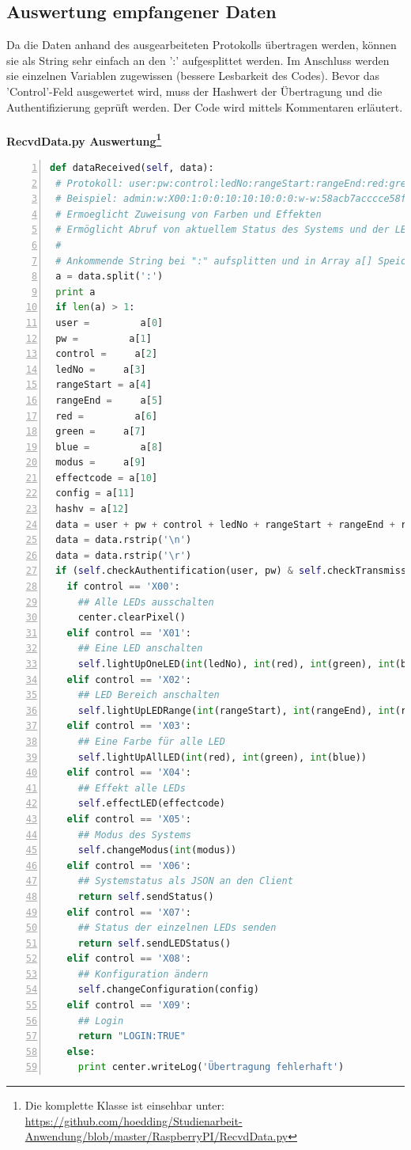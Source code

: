 \subsection{Auswertung empfangener Daten}
Da die Daten anhand des ausgearbeiteten Protokolls übertragen werden, können sie als String sehr einfach an den ':' aufgesplittet werden. Im Anschluss werden sie einzelnen Variablen zugewissen (bessere Lesbarkeit des Codes). Bevor das 'Control'-Feld ausgewertet wird, muss der Hashwert der Übertragung und die Authentifizierung geprüft werden. Der Code wird mittels Kommentaren erläutert. \\\\
\textbf{RecvdData.py Auswertung\footnote{Die komplette Klasse ist einsehbar unter: \url{https://github.com/hoedding/Studienarbeit-Anwendung/blob/master/RaspberryPI/RecvdData.py}}} 
\begin{lstlisting}[caption=Auswertung der empfangenen Daten (RcvdData.py), language=python, frame=single, breaklines=true,columns=fullflexible, commentstyle=\color{gray}\upshape, captionpos=b, numbers = left]
def dataReceived(self, data):
 # Protokoll: user:pw:control:ledNo:rangeStart:rangeEnd:red:green:blue:modus:effectcode:config:hashv
 # Beispiel: admin:w:X00:1:0:0:10:10:10:0:0:w-w:58acb7acccce58ffa8b953b12b5a7702bd42dae441c1ad85057fa70b
 # Ermoeglicht Zuweisung von Farben und Effekten
 # Ermöglicht Abruf von aktuellem Status des Systems und der LEDs
 #
 # Ankommende String bei ":" aufsplitten und in Array a[] Speichern:
 a = data.split(':')
 print a
 if len(a) > 1:
 user =         a[0]
 pw =         a[1]
 control =     a[2]
 ledNo =     a[3]
 rangeStart = a[4]
 rangeEnd =     a[5]
 red =         a[6]
 green =     a[7]
 blue =         a[8]
 modus =     a[9]
 effectcode = a[10]
 config = a[11]
 hashv = a[12]
 data = user + pw + control + ledNo + rangeStart + rangeEnd + red + green + blue + modus + effectcode + config
 data = data.rstrip('\n')
 data = data.rstrip('\r')
 if (self.checkAuthentification(user, pw) & self.checkTransmissionData(data, hashv)):
   if control == 'X00':
     ## Alle LEDs ausschalten
     center.clearPixel()
   elif control == 'X01':
     ## Eine LED anschalten
     self.lightUpOneLED(int(ledNo), int(red), int(green), int(blue))
   elif control == 'X02':
     ## LED Bereich anschalten
     self.lightUpLEDRange(int(rangeStart), int(rangeEnd), int(red), int(green), int(blue))
   elif control == 'X03':
     ## Eine Farbe für alle LED
     self.lightUpAllLED(int(red), int(green), int(blue))
   elif control == 'X04':
     ## Effekt alle LEDs
     self.effectLED(effectcode)
   elif control == 'X05':
     ## Modus des Systems
     self.changeModus(int(modus))
   elif control == 'X06':
     ## Systemstatus als JSON an den Client
     return self.sendStatus()
   elif control == 'X07':
     ## Status der einzelnen LEDs senden
     return self.sendLEDStatus()
   elif control == 'X08':
     ## Konfiguration ändern
     self.changeConfiguration(config)
   elif control == 'X09':
     ## Login
     return "LOGIN:TRUE"
   else:
     print center.writeLog('Übertragung fehlerhaft')
\end{lstlisting}



